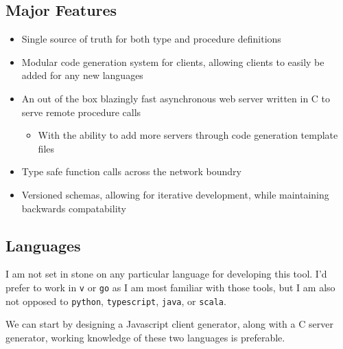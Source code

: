 \documentclass[11pt]{article}
\begin{document}
\subsection{Major Features}
\label{sec:org730eccb}
\begin{itemize}
\item Single source of truth for both type and procedure definitions
\item Modular code generation system for clients, allowing clients to easily be added for any new languages
\item An out of the box blazingly fast asynchronous web server written in C to serve remote procedure calls
\begin{itemize}
\item With the ability to add more servers through code generation template files
\end{itemize}
\item Type safe function calls across the network boundry
\item Versioned schemas, allowing for iterative development, while maintaining backwards compatability
\end{itemize}
\subsection{Languages}
\label{sec:org0d6715f}
I am not set in stone on any particular language for developing this tool. I'd prefer to work in \texttt{v} or \texttt{go} as I am most familiar with those tools, but I am also not opposed to \texttt{python}, \texttt{typescript}, \texttt{java}, or \texttt{scala}.

We can start by designing a Javascript client generator, along with a C server generator, working knowledge of these two languages is preferable.
\end{document}
